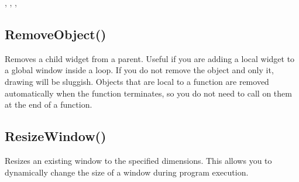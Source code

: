 \documentclass[letterpaper,10pt,english]{sphinxmanual}
\begin{document}
\sphinxAtStartPar
{}

\sphinxAtStartPar
{}, , , 

\ignorespaces 

\subsection{RemoveObject()}
\label{\detokenize{reference/peblobjects:removeobject}}\label{\detokenize{reference/peblobjects:index-39}}
\sphinxAtStartPar
{}

\sphinxAtStartPar
{}

\sphinxAtStartPar
Removes a child widget from a parent.  Useful if   you are adding a local widget to a global window inside a loop.  If   you do not remove the object and only  it, drawing will   be sluggish.  Objects that are local to a function are removed   automatically when the function terminates, so you do not need to   call  on them at the end of a function.

\sphinxAtStartPar
{}

\begin{sphinxVerbatim}[commandchars=\\\{\}]
\end{sphinxVerbatim}

\ignorespaces 

\subsection{ResizeWindow()}
\label{\detokenize{reference/peblobjects:resizewindow}}\label{\detokenize{reference/peblobjects:index-40}}
\sphinxAtStartPar
{}

\sphinxAtStartPar
{}

\sphinxAtStartPar
Resizes an existing window to the specified dimensions. This allows you to dynamically change the size of a window during program execution.
\end{document}
